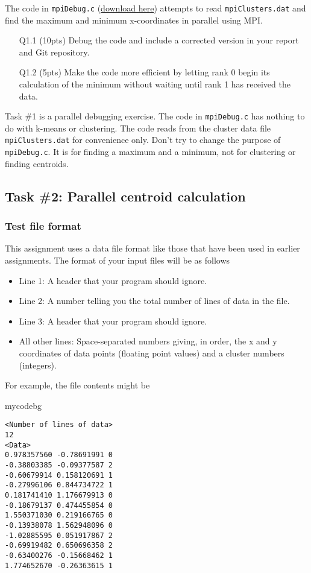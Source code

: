 The code in \texttt{mpiDebug.c} (\href{https://canvas.vt.edu/files/11482160/download?download_frd=1}{download here}) attempts to read \texttt{mpiClusters.dat} and find the maximum and minimum x-coordinates in parallel using MPI.
\begin{itemize}
     \item[Q1.1] (10pts) Debug the code and include a corrected version in your report and Git repository.
    \item[Q1.2] (5pts) Make the code more efficient by letting rank 0 begin its calculation of the minimum without waiting until rank 1 has received the data.
\end{itemize}
\begin{tcolorbox}[width=\textwidth,colback=green]
Task \#1 is a parallel debugging exercise.
The code in \texttt{mpiDebug.c} has nothing to do with k-means or clustering.
The code reads from the cluster data file \texttt{mpiClusters.dat} for convenience only.
Don't try to change the purpose of \texttt{mpiDebug.c}.
It is for finding a maximum and a minimum, not for clustering or finding centroids.
\end{tcolorbox}
\subsection*{Task \#2: Parallel centroid calculation}
\subsubsection*{Test file format}
This assignment uses a data file format like those that have been used in earlier assignments.
The format of your input files will be as follows
\begin{itemize}
    \item Line 1: A header that your program should ignore.
    \item Line 2: A number telling you the total number of lines of data in the file.
    \item Line 3: A header that your program should ignore.
    \item All other lines: Space-separated numbers giving, in order, the x and y coordinates of data points (floating point values) and a cluster numbers (integers).
\end{itemize}
For example, the file contents might be
\begin{tsession}{mycodebg}
\begin{verbatim}
<Number of lines of data>
12
<Data>
0.978357560 -0.78691991 0
-0.38803385 -0.09377587 2
-0.60679914 0.158120691 1
-0.27996106 0.844734722 1
0.181741410 1.176679913 0
-0.18679137 0.474455854 0
1.550371030 0.219166765 0
-0.13938078 1.562948096 0
-1.02885595 0.051917867 2
-0.69919482 0.650696358 2
-0.63400276 -0.15668462 1
1.774652670 -0.26363615 1
\end{verbatim}
\end{tsession}
